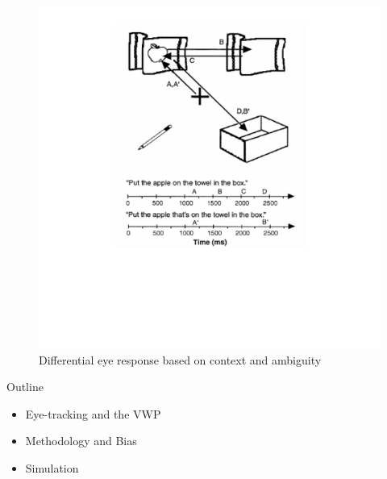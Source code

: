 \documentclass{beamer}
\newcommand{\vp}{\vspace{2mm}}
\begin{document}
\begin{frame}%
\begin{figure}
\centering
\includegraphics[width=\textwidth]{apple_combine_half.pdf}
\caption{Differential eye response based on context and ambiguity}
\end{figure}
\end{frame}


\begin{frame}{Outline}\large


\begin{itemize}
	\item Eye-tracking and the VWP \vp
	\item Methodology and Bias \vp
	\item Simulation
\end{itemize}

\end{frame}
\end{document}
